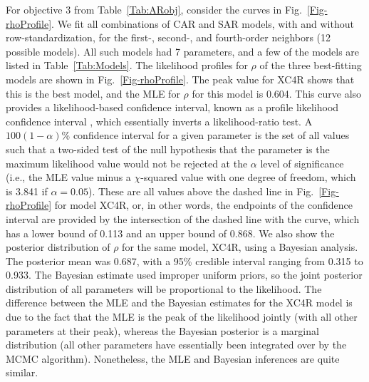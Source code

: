 \documentclass[11pt, titlepage]{article}\usepackage[]{graphicx}\usepackage[]{color}
\begin{document}
\begin{spacing}{1.9}
\begin{flushleft}
For objective 3 from Table~\ref{Tab:ARobj}, consider the curves in Fig.~\ref{Fig-rhoProfile}.  We fit all combinations of CAR and SAR models, with and without row-standardization, for the first-, second-, and fourth-order neighbors (12 possible models).  All such models had 7 parameters, and a few of the models are listed in Table~\ref{Tab:Models}. The likelihood profiles for $\rho$ of the three best-fitting models are shown in Fig.~\ref{Fig-rhoProfile}. The peak value for XC4R shows that this is the best model, and the MLE for $\rho$ for this model is 0.604.  This curve also provides a likelihood-based confidence interval, known as a profile likelihood confidence interval \citep{Box:Cox:anal:1964}, which essentially inverts a likelihood-ratio test. A $100(1 - \alpha)$\% confidence interval for a given parameter is the set of all values such that a two-sided test of the null hypothesis that the parameter is the maximum likelihood value would not be rejected at the $\alpha$ level of significance (i.e., the MLE value minus a $\chi$-squared value with one degree of freedom, which is 3.841 if $\alpha = 0.05$).  These are all values above the dashed line in Fig.~\ref{Fig-rhoProfile} for model XC4R, or, in other words, the endpoints of the confidence interval are provided by the intersection of the dashed line with the curve, which has a lower bound of 0.113 and an upper bound of 0.868.  We also show the posterior distribution of $\rho$ for the same model, XC4R, using a Bayesian analysis.  The posterior mean was 0.687, with a 95\% credible interval ranging from 0.315 to 0.933.  The Bayesian estimate used improper uniform priors, so the joint posterior distribution of all parameters will be proportional to the likelihood.  The difference between the MLE and the Bayesian estimates for the XC4R model is due to the fact that the MLE is the peak of the likelihood jointly (with all other parameters at their peak), whereas the Bayesian posterior is a marginal distribution (all other parameters have essentially been integrated over by the MCMC algorithm).  Nonetheless, the MLE and Bayesian inferences are quite similar. 


\end{flushleft}
\end{spacing}
\end{document}
